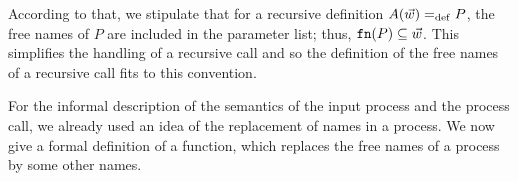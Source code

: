 
According to that, we stipulate that for a recursive definition $A(\vec{w})=_{\mathrm{def}} P$, the free names of $P$ are included in the parameter list; thus, $\mathtt{fn}(P)\subseteq\vec{w}$. This simplifies the handling of a recursive call and so the definition of the free names of a recursive call fits to this convention.


For the informal description of the semantics of the input process and the process call, we already used an idea of the replacement of names in a process. We now give a formal definition of a function, which replaces the free names of a process by some other names.

